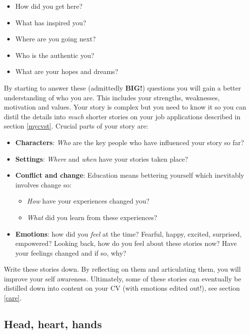 \documentclass[
]{book}
\providecommand{\tightlist}{%
  \setlength{\itemsep}{0pt}\setlength{\parskip}{0pt}}
\begin{document}
\begin{itemize}
\tightlist
\item
  How did you get here?
\item
  What has inspired you?
\item
  Where are you going next?
\item
  Who is the authentic you? \citep{regrets}
\item
  What are your hopes and dreams?
\end{itemize}

By starting to answer these (admittedly \textbf{BIG!}) questions you will gain a better understanding of who you are. This includes your strengths, weaknesses, motivation and values. \citep{parachute2020} Your story is complex but you need to know it so you can distil the details into \emph{much} shorter stories on your job applications described in section \ref{mycvst}. Crucial parts of your story are:

\begin{itemize}
\tightlist
\item
  \textbf{Characters}: \emph{Who} are the key people who have influenced your story so far?
\item
  \textbf{Settings}: \emph{Where} and \emph{when} have your stories taken place?
\item
  \textbf{Conflict and change}: Education means bettering yourself which inevitably involves change so:

  \begin{itemize}
  \tightlist
  \item
    \emph{How} have your experiences changed you?
  \item
    \emph{What} did you learn from these experiences?
  \end{itemize}
\item
  \textbf{Emotions}: how did you \emph{feel} at the time? Fearful, happy, excited, surprised, empowered? Looking back, how do you feel about these stories now? Have your feelings changed and if so, why?
\end{itemize}

Write these stories down. By reflecting on them and articulating them, you will improve your self awareness. Ultimately, some of these stories can eventually be distilled down into content on your CV (with emotions edited out!), see section \ref{care}.

\hypertarget{hhh}{%
\subsection{Head, heart, hands}\label{hhh}}
\end{document}
